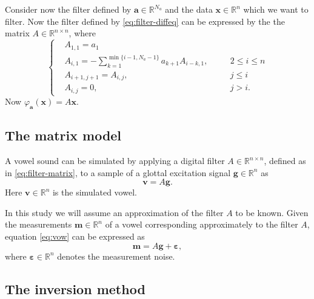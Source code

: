 \documentclass[12pt,a4]{article}
\newcommand{\R}{{\mathbb R}}
\newcommand{\eps}{\ensuremath{\varepsilon}}
\newcommand{\vc}[1]{\ensuremath{\bm{#1}}}
\begin{document}
Consider now the filter defined by $\vc{a} \in \R^{N_a}$ and the data $\vc{x} \in \R^n$ which we want to filter. Now the filter defined by \eqref{eq:filter-diffeq} can be expressed by the the matrix $A \in \R^{n \times n}$, where
\begin{equation}
\label{eq:filter-matrix}
\left\{
\begin{alignedat}{3}
   &A_{1,1}     = a_1 \\
   &A_{i,1}     = - \sum_{k=1}^{\min\{ i-1, N_a-1 \}} a_{k+1} A_{i-k,1}, \quad && 2 \leq i \leq n \\
   &A_{i+1,j+1} = A_{i,j},     && j \leq i \\
   &A_{i,j}     = 0,           && j > i .
\end{alignedat}
\right.
\end{equation}
Now $\varphi_{\vc{a}} (\vc{x}) = A \vc{x}$.


\subsection{The matrix model}
\label{sec:matrixModel}

A vowel sound can be simulated by applying a digital filter $A \in \R^{n \times n}$, defined as in \eqref{eq:filter-matrix}, to a sample of a glottal excitation signal $\vc{g} \in \R^n$ as
\begin{equation}
\label{eq:vow}
\vc{v} = A \vc{g} .
\end{equation}
Here $\vc{v} \in \R^n$ is the simulated vowel.

In this study we will assume an approximation of the filter $A$ to be known. Given the measurements $\vc{m} \in \R^n$ of a vowel corresponding approximately to the filter $A$, equation \eqref{eq:vow} can be expressed as
\begin{equation}
\label{eq:vowModel}
\vc{m} = A \vc{g} + \vc{\eps},
\end{equation}
where $\vc{\eps} \in \R^n$ denotes the measurement noise.


\subsection{The inversion method}\label{sec:invMethod}
\end{document}
